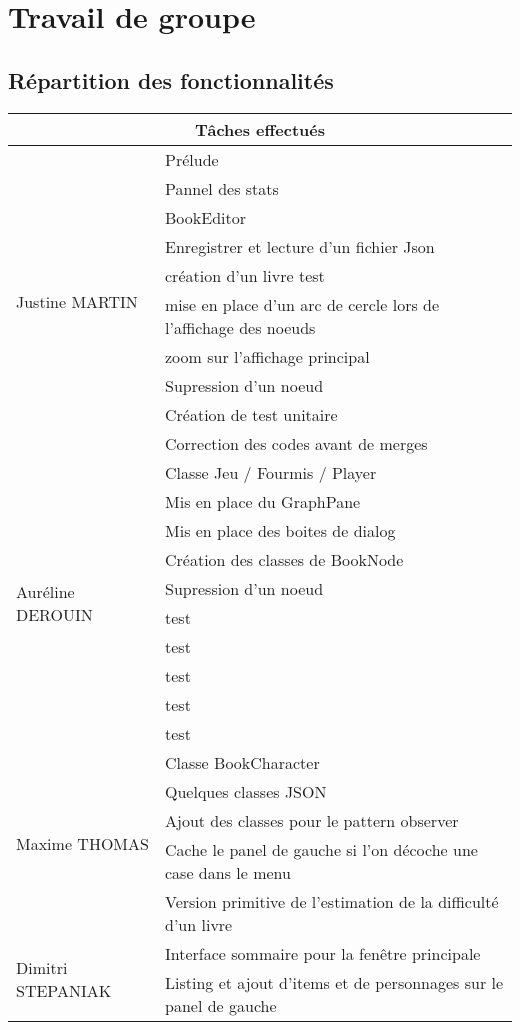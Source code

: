 \chapter{Travail de groupe}

	\section{Répartition des fonctionnalités}
	\begin{tabular}{|l|l|}
		\hline
		\multicolumn{2}{|c|}{Tâches effectués} \\
		\hline
		\multirow{10}{*}{Justine MARTIN}
			& Prélude\\
			& Pannel des stats\\
			& BookEditor\\
			& Enregistrer et lecture d'un fichier Json\\
			& création d'un livre test\\
			& mise en place d'un arc de cercle lors de l'affichage des noeuds\\
			& zoom sur l'affichage principal\\
			& Supression d'un noeud\\
			& Création de test unitaire\\
			& Correction des codes avant de merges\\
		\hline
		\multirow{10}{*}{Auréline DEROUIN}
			& Classe Jeu / Fourmis / Player\\
			& Mis en place du GraphPane\\
			& Mis en place des boites de dialog\\
			& Création des classes de BookNode\\
			& Supression d'un noeud\\
			& test\\
			& test\\
			& test\\
			& test\\
			& test\\
		\hline
  		\multirow{5}{*}{Maxime THOMAS}
			& Classe BookCharacter\\
			& Quelques classes JSON\\
			& Ajout des classes pour le pattern observer\\
			& Cache le panel de gauche si l'on décoche une case dans le menu\\
			& Version primitive de l'estimation de la difficulté d'un livre\\
		\hline
		\multirow{2}{*}{Dimitri STEPANIAK}
			& Interface sommaire pour la fenêtre principale\\
			& Listing et ajout d'items et de personnages sur le panel de gauche\\
		\hline
		\end{tabular}

